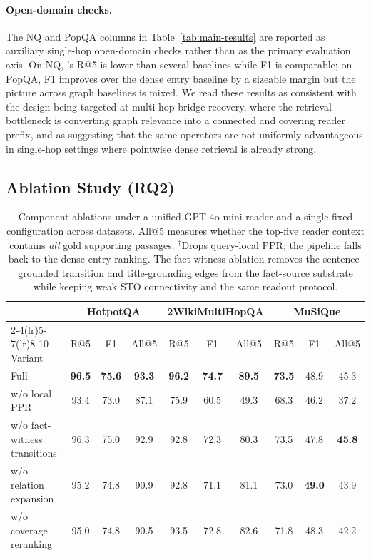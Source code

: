 \paragraph{Open-domain checks.}
The NQ and PopQA columns in Table~\ref{tab:main-results} are reported
as auxiliary single-hop open-domain checks rather than as the primary
evaluation axis. On NQ, \methodname{}'s R@5 is lower than several
baselines while F1 is comparable; on PopQA, F1 improves over the
dense entry baseline by a sizeable margin but the picture across
graph baselines is mixed. We read these results as consistent with the
design being targeted at multi-hop bridge recovery, where the
retrieval bottleneck is converting graph relevance into a connected
and covering reader prefix, and as suggesting that the same operators
are not uniformly advantageous in single-hop settings where pointwise
dense retrieval is already strong.

\subsection{Ablation Study (RQ2)}
\label{sec:experiments:ablation}

\begin{table}[t]
\centering
\small
\setlength{\tabcolsep}{4pt}
\begin{tabular}{lccc ccc ccc}
\toprule
& \multicolumn{3}{c}{HotpotQA} &
\multicolumn{3}{c}{2WikiMultiHopQA} &
\multicolumn{3}{c}{MuSiQue} \\
\cmidrule(lr){2-4}\cmidrule(lr){5-7}\cmidrule(lr){8-10}
Variant & R@5 & F1 & All@5 & R@5 & F1 & All@5 & R@5 & F1 & All@5 \\
\midrule
Full \methodname{} & \textbf{96.5} & \textbf{75.6} & \textbf{93.3}
& \textbf{96.2} & \textbf{74.7} & \textbf{89.5}
& \textbf{73.5} & 48.9 & 45.3 \\
\midrule
w/o local PPR \rlap{$^{\dagger}$}            & 93.4 & 73.0 & 87.1 & 75.9 & 60.5 & 49.3 & 68.3 & 46.2 & 37.2 \\
w/o fact-witness transitions                  & 96.3 & 75.0 & 92.9 & 92.8 & 72.3 & 80.3 & 73.5 & 47.8 & \textbf{45.8} \\
w/o relation expansion                        & 95.2 & 74.8 & 90.9 & 92.8 & 71.1 & 81.1 & 73.0 & \textbf{49.0} & 43.9 \\
w/o coverage reranking                        & 95.0 & 74.8 & 90.5 & 93.5 & 72.8 & 82.6 & 71.8 & 48.3 & 42.2 \\
\bottomrule
\end{tabular}
\caption{Component ablations under a unified GPT-4o-mini reader and a
single fixed configuration across datasets. All@5 measures whether the
top-five reader context contains \emph{all} gold supporting passages.
$^{\dagger}$Drops query-local PPR; the pipeline falls back to the dense
entry ranking. The fact-witness ablation removes the
sentence-grounded transition and title-grounding edges from the
fact-source substrate while keeping weak STO connectivity and the same
readout protocol.}
\label{tab:ablation}
\end{table}

